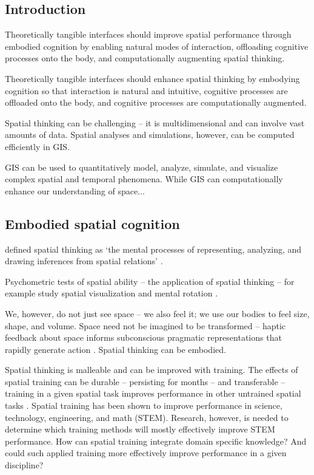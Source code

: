 \subsection{Introduction}
Theoretically tangible interfaces 
should improve spatial performance 
through embodied cognition by 
enabling natural modes of interaction, 
offloading cognitive processes onto the body, 
and computationally augmenting spatial thinking.

Theoretically tangible interfaces 
should enhance spatial thinking 
by embodying cognition so that 
interaction is natural and intuitive,
cognitive processes are offloaded onto the body,
and cognitive processes are computationally augmented.


Spatial thinking can be challenging --
it is multidimensional and 
can involve vast amounts of data. 
Spatial analyses and simulations, however, 
can be computed efficiently in GIS. 
%


GIS can be used to quantitatively model, analyze, simulate, and visualize 
complex spatial and temporal phenomena. %
%
While GIS can computationally enhance our understanding of space...



\subsection{Embodied spatial cognition}



\citeauthor{Uttal2013} defined spatial thinking as 
`the mental processes of representing, analyzing, and drawing inferences from spatial relations' \citeyearpar{Uttal2013}. 


Psychometric tests of spatial ability -- the application of spatial thinking -- for example study spatial visualization and mental rotation \citep{Uttal2013,Uttal2013a,Ormand2014}.

We, however, do not just see space -- we also feel it; we use our bodies to feel size, shape, and volume. 
Space need not be imagined to be transformed -- haptic feedback about space informs subconscious pragmatic representations that rapidly generate action \citep{Jeannerod1997}. Spatial thinking can be embodied.

Spatial thinking is malleable and can be improved with training. 
The effects of spatial training can be durable -- persisting for months -- and transferable -- training in a given spatial task improves performance in other untrained spatial tasks \citep{Uttal2013}. 
Spatial training has been shown to improve performance in science, technology, engineering, and math (STEM). 
Research, however, is needed to determine which training methods will mostly effectively improve STEM performance. 
How can spatial training integrate domain specific knowledge? And could such applied training more effectively improve performance in a given discipline? \citep{Uttal2013} 


